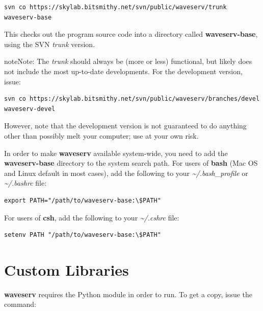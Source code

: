 \documentclass[letterpaper,10pt,english]{sphinxmanual}
\begin{document}
\begin{Verbatim}[commandchars=\\\{\}]
svn co https://skylab.bitsmithy.net/svn/public/waveserv/trunk waveserv-base
\end{Verbatim}

This checks out the program source code into a directory called \textbf{waveserv-base}, using the SVN \emph{trunk} version.

\begin{notice}{note}{Note:}
The \emph{trunk} should always be (more or less) functional, but likely does not include the most up-to-date developments.  For the development version, issue:

\begin{Verbatim}[commandchars=\\\{\}]
svn co https://skylab.bitsmithy.net/svn/public/waveserv/branches/devel waveserv-devel
\end{Verbatim}

However, note that the development version is not guaranteed to do anything other than possibly melt your computer; use at your own risk.
\end{notice}

In order to make \textbf{waveserv} available system-wide, you need to add the \textbf{waveserv-base} directory to the system search path.  For users of \textbf{bash} (Mac OS and Linux default in most cases), add the following to your \emph{\textasciitilde{}/.bash\_profile} or \emph{\textasciitilde{}/.bashrc} file:

\begin{Verbatim}[commandchars=\\\{\}]
export PATH="/path/to/waveserv-base:\$PATH"
\end{Verbatim}

For users of \textbf{csh}, add the following to your \emph{\textasciitilde{}/.cshrc} file:

\begin{Verbatim}[commandchars=\\\{\}]
setenv PATH "/path/to/waveserv-base:\$PATH"
\end{Verbatim}


\section{Custom Libraries}
\label{installation:custom-libraries}
\textbf{waveserv} requires the  Python module in order to run.  To get a copy, issue the command:
\end{document}
